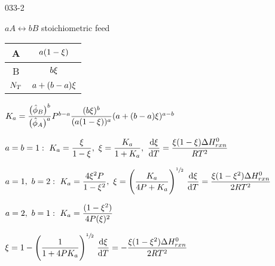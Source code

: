 \begin{mitframe}{033-2}

  
    \begin{listone}
    
    \item $aA\leftrightarrow bB$ stoichiometric feed

 	\item
    \begin{tabular}{|c|c|}
    \hline
    A & $a(1-\extent)$\\ \hline
    B & $b\extent$ \\ \hline
    $\nummoles_{\Temp}$ & $a+(b-a)\extent$ \\ \hline
    \end{tabular} 
    
    \item $\eqconst = \dfrac{\big(\hat{\fugcoeff}_{B}\big)^{b}}{\big(\hat{\fugcoeff}_{A}\big)^{a}}\p^{b-a}\dfrac{(b\extent)^{b}}{(a(1-\extent))^{a}}(a+(b-a)\extent)^{a-b}$
    
    \item $a=b=1:~\eqconst=\dfrac{\extent}{1-\extent},~\extent=\dfrac{\eqconst}{1+\eqconst},~\dfrac{\mathrm{d}\extent}{\mathrm{d}\Temp}=\dfrac{\extent(1-\extent)\iipf\enthalpy^{\init}_{rxn}}{\gasconst\Temp^2}$
    
    \item $a=1,~b=2:~\eqconst=\dfrac{4\extent^{2}\p}{1-\extent^{2}},~\extent=\Bigg(\dfrac{\eqconst}{4\p+\eqconst}\Bigg)^{\sfrac{1}{2}}~\dfrac{\mathrm{d}\extent}{\mathrm{d}\Temp}=\dfrac{\extent(1-\extent^{2})\iipf\enthalpy^{\init}_{rxn}}{2\gasconst\Temp^{2}}$
    
    \item $a=2,~b=1:~\eqconst=\dfrac{(1-\extent^{2})}{4\p(\extent)^{2}}$
	
    \item $\extent=1-\Bigg(\dfrac{1}{1+4\p\eqconst}\Bigg)^{\sfrac{1}{2}}~\dfrac{\mathrm{d}\extent}{\mathrm{d}\Temp}=-\dfrac{\extent(1-\extent^{2})\iipf\enthalpy^{\init}_{rxn}}{2\gasconst\Temp^{2}}$

	\end{listone}

\end{mitframe}